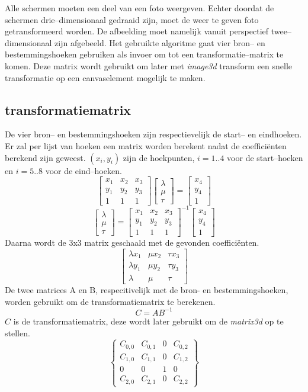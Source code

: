 
	Alle schermen moeten een deel van een foto weergeven. Echter doordat de schermen drie--dimensionaal gedraaid zijn, moet de weer te geven foto getransformeerd worden. De afbeelding moet namelijk vanuit perspectief twee--dimensionaal zijn afgebeeld. Het gebruikte algoritme gaat vier bron-- en bestemmingshoeken gebruiken als invoer om tot een transformatie--matrix te komen. Deze matrix wordt gebruikt om later met {\it image3d} transform een snelle transformatie op een canvaselement mogelijk te maken.

\subsection{transformatiematrix}
De vier bron-- en bestemmingshoeken zijn respectievelijk de start-- en eindhoeken. Er zal per lijst van hoeken een matrix worden berekent nadat de coefficiënten berekend zijn geweest. $(x_i, y_i)$ zijn de hoekpunten, $i = 1..4$ voor de start--hoeken en $i = 5..8$ voor de eind--hoeken. \cite{redrawImageFrom3dPerspectiveTo2d}
$$ \begin{bmatrix}
x_1 & x_2 & x_3 \\ y_1 & y_2 & y_3 \\ 1 & 1 & 1
\end{bmatrix} \begin{bmatrix}
\lambda \\ \mu \\ \tau
\end{bmatrix} =
\begin{bmatrix}
x_4 \\ y_4 \\ 1
\end{bmatrix}
$$
$$ \begin{bmatrix}
\lambda \\ \mu \\ \tau
\end{bmatrix} =\begin{bmatrix}
x_1 & x_2 & x_3 \\ y_1 & y_2 & y_3 \\ 1 & 1 & 1
\end{bmatrix}^{-1}
\begin{bmatrix}
x_4 \\ y_4 \\ 1
\end{bmatrix}
$$
Daarna wordt de 3x3 matrix geschaald met de gevonden coefficiënten.
$$
\begin{bmatrix}
\lambda x_1 & \mu x_2 & \tau x_3 \\ \lambda y_1 & \mu y_2 & \tau y_3 \\ \lambda & \mu & \tau
\end{bmatrix}
$$
De twee matrices A en B, respecitivelijk met de bron- en bestemmingshoeken, worden gebruikt om de transformatiematrix te berekenen.
$$ C = AB^{-1}$$
$C$ is de transformatiematrix, deze wordt later gebruikt om de {\it matrix3d} op te stellen. \cite{projectiveTransformation}
$$
\begin{Bmatrix}
C_{0,0}	& 	C_{0,1}	&	0	&	C_{0,2} 	\\
C_{1,0}	&	C_{1,1} 	&	0	&	C_{1,2} 	\\
0		&	0		&	1	&	0		\\
C_{2,0}	&	C_{2,1}	&	0	&	C_{2,2}
\end{Bmatrix}
$$
